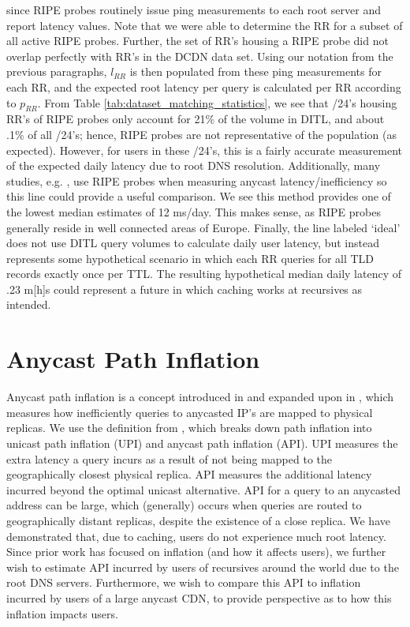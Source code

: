 \documentclass[sigconf,nonacm,10pt]{acmart}
\begin{document}
since RIPE probes routinely issue ping measurements to each root server
and report latency values. Note that we were able to determine the RR
for a subset of all active RIPE probes. Further, the set of RR's housing
a RIPE probe did not overlap perfectly with RR's in the DCDN data set.
Using our notation from the previous paragraphs, \(l_{RR}\) is then
populated from these ping measurements for each RR, and the expected
root latency per query is calculated per RR according to \(p_{RR}\).
From Table \ref{tab:dataset_matching_statistics}, we see that /24's
housing RR's of RIPE probes only account for 21\% of the volume in DITL,
and about .1\% of all /24's; hence, RIPE probes are not representative
of the population (as expected). However, for users in these /24's, this
is a fairly accurate measurement of the expected daily latency due to
root DNS resolution. Additionally, many studies, e.g.
\cite{li_levin_spring_bhattacharjee_2018}, use RIPE probes when
measuring anycast latency/inefficiency so this line could provide a
useful comparison. We see this method provides one of the lowest median
estimates of 12 ms/day. This makes sense, as RIPE probes generally
reside in well connected areas of Europe. \break \break
Finally, the line labeled `ideal' does not use DITL query volumes to
calculate daily user latency, but instead represents some hypothetical
scenario in which each RR queries for all TLD records exactly once per
TTL. The resulting hypothetical median daily latency of .23 m{[}h{]}s
could represent a future in which caching works at recursives as
intended.

\section{Anycast Path Inflation}\label{anycast-path-inflation}

\label{sec:api} Anycast path inflation is a concept introduced in
\cite{de2017anycast} and expanded upon in
\cite{li_levin_spring_bhattacharjee_2018}, which measures how
inefficiently queries to anycasted IP's are mapped to physical replicas.
We use the definition from \cite{li_levin_spring_bhattacharjee_2018},
which breaks down path inflation into unicast path inflation (UPI) and
anycast path inflation (API). UPI measures the extra latency a query
incurs as a result of not being mapped to the geographically closest
physical replica. API measures the additional latency incurred beyond
the optimal unicast alternative. API for a query to an anycasted address
can be large, which (generally) occurs when queries are routed to
geographically distant replicas, despite the existence of a close
replica. \break
We have demonstrated that, due to caching, users do not experience much
root latency. Since prior work has focused on inflation (and how it
affects users), we further wish to estimate API incurred by users of
recursives around the world due to the root DNS servers. Furthermore, we
wish to compare this API to inflation incurred by users of a large
anycast CDN, to provide perspective as to how this inflation impacts
users.
\end{document}
